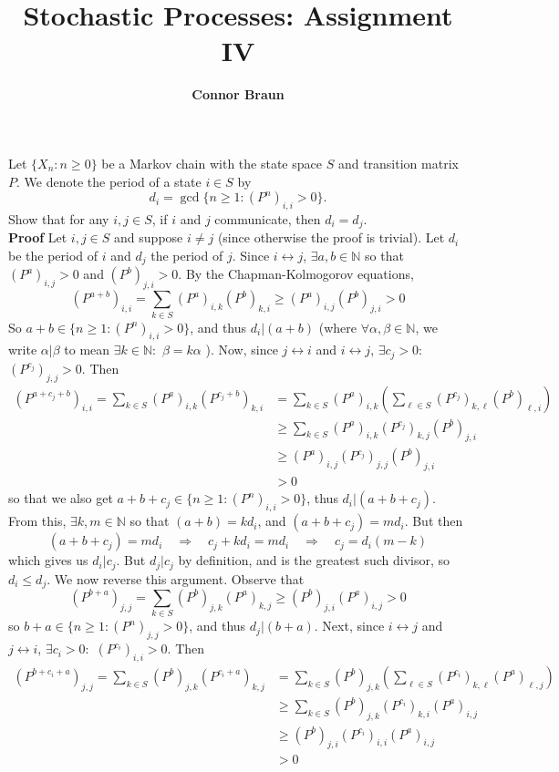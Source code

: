 \documentclass[11pt, letterpaper]{article}
\title{\bf Stochastic Processes: Assignment IV}
\author{\bf Connor Braun}
\date{}
\newcommand{\mbb}[1]{\mathbb{#1}}
\begin{document}
    
    \maketitle
     Let $\{X_n:n\geq 0\}$ be a Markov chain with the state space $S$ and transition matrix $P$. We denote the period of a state $i\in S$ by
    \[d_i=\gcd\{n\geq 1:(P^n)_{i,i}>0\}.\]
    Show that for any $i,j\in S$, if $i$ and $j$ communicate, then $d_i=d_j$.\\[10pt]
    {\bf Proof} Let $i,j\in S$ and suppose $i\neq j$ (since otherwise the proof is trivial). Let $d_i$ be the period of $i$ and $d_j$ the period of $j$. Since $i\longleftrightarrow j$, $\exists a,b\in\mbb{N}$ so that
    $(P^{a})_{i,j}>0$ and $(P^{b})_{j,i}>0$. By the Chapman-Kolmogorov equations,
    \[(P^{a+b})_{i,i}=\sum_{k\in S}(P^{a})_{i,k}(P^{b})_{k,i}\geq (P^{a})_{i,j}(P^{b})_{j,i}>0\]
    So $a+b\in\{n\geq 1:(P^n)_{i,i}>0\}$, and thus $d_i|(a+b)$ (where $\forall \alpha,\beta\in\mbb{N}$, we write $\alpha|\beta$ to mean $\exists k\in\mbb{N}:$ $\beta=k\alpha$ ).
    Now, since $j\longleftrightarrow i$ and $i\longleftrightarrow j$, $\exists {c_j}>0:$ $(P^{c_j})_{j,j}>0$. Then
    \begin{align*}
        (P^{a+c_j+b})_{i,i}=\sum_{k\in S}(P^a)_{i,k}(P^{c_j+b})_{k,i}&=\sum_{k\in S}(P^a)_{i,k}\left(\sum_{\ell\in S}(P^{c_j})_{k,\ell}(P^{b})_{\ell, i}\right)\\
        &\geq\sum_{k\in S}(P^a)_{i,k}(P^{c_j})_{k,j}(P^b)_{j,i}\\
        &\geq (P^a)_{i,j}(P^{c_j})_{j,j}(P^b)_{j,i}\\
        &>0
    \end{align*}
    so that we also get $a+b+{c_j}\in\{n\geq 1:(P^n)_{i,i}>0\}$, thus $d_i|(a+b+{c_j})$. From this, $\exists k,m\in\mbb{N}$ so that $(a+b)=kd_i$, and $(a+b+{c_j})=md_i$. But then
    \[(a+b+{c_j})=md_i\quad\Rightarrow\quad {c_j}+kd_i=md_i\quad\Rightarrow\quad {c_j}=d_i(m-k)\]
    which gives us $d_i|{c_j}$. But $d_j|{c_j}$ by definition, and is the greatest such divisor, so $d_i\leq d_j$. We now reverse this argument. Observe that
    \[(P^{b+a})_{j,j}=\sum_{k\in S}(P^{b})_{j,k}(P^{a})_{k,j}\geq (P^{b})_{j,i}(P^{a})_{i,j}>0\]
    so $b+a\in\{n\geq 1: (P^n)_{j,j}>0\}$, and thus $d_j|(b+a)$. Next, since $i\longleftrightarrow j$ and $j\longleftrightarrow i$, $\exists c_i>0:$ $(P^{c_i})_{i,i}>0$. Then
    \begin{align*}
        (P^{b+c_i+a})_{j,j}=\sum_{k\in S}(P^b)_{j,k}(P^{c_i+a})_{k,j}&=\sum_{k\in S}(P^b)_{j,k}\left(\sum_{\ell\in S}(P^{c_i})_{k,\ell}(P^{a})_{\ell, j}\right)\\
        &\geq\sum_{k\in S}(P^b)_{j,k}(P^{c_i})_{k,i}(P^a)_{i,j}\\
        &\geq (P^b)_{j,i}(P^{c_i})_{i,i}(P^a)_{i,j}\\
        &>0
    \end{align*} 
\end{document}
